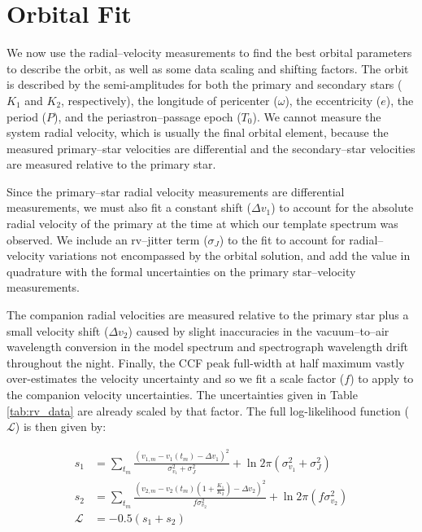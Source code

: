 \section{Orbital Fit}
\label{sec:orbit}

We now use the radial--velocity measurements to find the best orbital parameters to describe the orbit, as well as some data scaling and shifting factors. The orbit is described by the semi-amplitudes for both the primary and secondary stars ($K_1$ and $K_2$, respectively), the longitude of pericenter ($\omega$), the eccentricity ($e$), the period ($P$), and the periastron--passage epoch ($T_0$). We cannot measure the system radial velocity, which is usually the final orbital element, because the measured primary--star velocities are differential and the secondary--star velocities are measured relative to the primary star.

Since the primary--star radial velocity measurements are differential measurements, we must also fit a constant shift ($\Delta v_1$) to account for the absolute radial velocity of the primary at the time at which our template spectrum was observed. We include an rv--jitter term ($\sigma_J$) to the fit to account for radial--velocity variations not encompassed by the orbital solution, and add the value in quadrature with the formal uncertainties on the primary star--velocity measurements. 

The companion radial velocities are measured relative to the primary star plus a small velocity shift ($\Delta v_2$) caused by slight inaccuracies in the vacuum--to--air wavelength conversion in the model spectrum and spectrograph wavelength drift throughout the night. Finally, the CCF peak full-width at half maximum vastly over-estimates the velocity uncertainty and so we fit a scale factor ($f$) to apply to the companion velocity uncertainties. The uncertainties given in Table \ref{tab:rv_data} are already scaled by that factor. The full log-likelihood function ($\mathcal{L}$) is then given by:

\begin{align*}
s_1 &= \sum_{t_m} \frac{(v_{1,m} - v_1(t_m) - \Delta v_1)^2 }{\sigma_{v_1}^2 + \sigma_J^2} + \ln{2\pi(\sigma_{v_1}^2 + \sigma_J^2)} \\
s_2 &= \sum_{t_m} \frac{(v_{2,m} - v_2(t_m)(1+\frac{K_1}{K_2}) - \Delta v_2)^2}{f\sigma_{v_2}^2 } + \ln{2\pi(f\sigma_{v_2}^2)} \\ 
\mathcal{L} &= -0.5(s_1 + s_2) \\
\end{align*}

